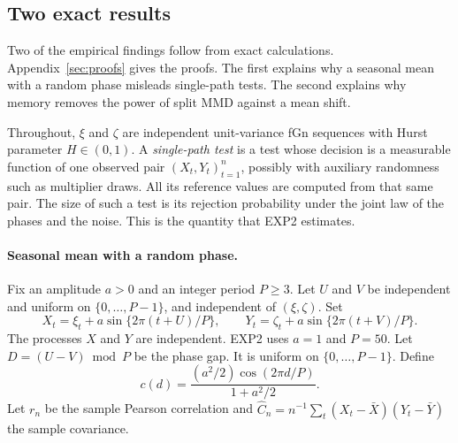 \documentclass[11pt]{article}
\theoremstyle{remark}
\begin{document}
\subsection{Two exact results}\label{sec:props}
Two of the empirical findings follow from exact calculations. Appendix~\ref{sec:proofs} gives the proofs. The first explains why a seasonal mean with a random phase misleads single-path tests. The second explains why memory removes the power of split MMD against a mean shift.

Throughout, $\xi$ and $\zeta$ are independent unit-variance fGn sequences with Hurst parameter $H\in(0,1)$. A \emph{single-path test} is a test whose decision is a measurable function of one observed pair $(X_t,Y_t)_{t=1}^n$, possibly with auxiliary randomness such as multiplier draws. All its reference values are computed from that same pair. The size of such a test is its rejection probability under the joint law of the phases and the noise. This is the quantity that EXP2 estimates.

\paragraph{Seasonal mean with a random phase.}
Fix an amplitude $a>0$ and an integer period $P\ge3$. Let $U$ and $V$ be independent and uniform on $\{0,\ldots,P-1\}$, and independent of $(\xi,\zeta)$. Set
\begin{equation}\label{eq:seasm}
X_t=\xi_t+a\sin\{2\pi(t+U)/P\},\qquad Y_t=\zeta_t+a\sin\{2\pi(t+V)/P\}.
\end{equation}
The processes $X$ and $Y$ are independent. EXP2 uses $a=1$ and $P=50$. Let $D=(U-V)\bmod P$ be the phase gap. It is uniform on $\{0,\ldots,P-1\}$. Define
\begin{equation}\label{eq:climit}
c(d)=\frac{(a^2/2)\cos(2\pi d/P)}{1+a^2/2}.
\end{equation}
Let $r_n$ be the sample Pearson correlation and $\hat C_n=n^{-1}\sum_t(X_t-\bar X)(Y_t-\bar Y)$ the sample covariance.
\end{document}
